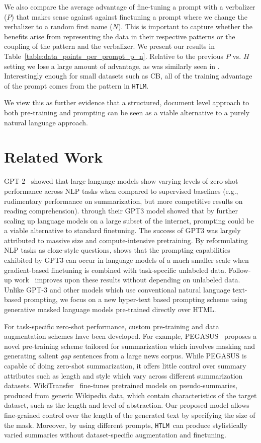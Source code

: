 \documentclass[11pt,a4paper]{article}
\newcommand{\HTLM}{\texttt{HTLM}}
\begin{document}
We also compare the average advantage of fine-tuning a prompt with a verbalizer ($P$) that makes sense against against finetuning a prompt where we change the verbalizer to a random first name ($N$). This is important to capture whether the benefits arise from representing the data in their respective patterns or the coupling of the pattern and the verbalizer. We present our results in Table~\ref{table:data_points_per_prompt_p_n}. Relative to the previous $P$ vs. $H$ setting we lose a large amount of advantage, as was similarly seen in \citep{how_many_datapoints}. Interestingly enough for small datasets such as CB, all of the training advantage of the prompt comes from the pattern in \HTLM{}.

We view this as further evidence that a structured, document level approach to both pre-training and prompting can be seen as a viable alternative to a purely natural language approach.

\section{Related Work}
GPT-2~\cite{GPT2} showed that large language models show varying levels of zero-shot performance across NLP tasks when compared to supervised baselines (e.g., rudimentary performance on summarization, but more competitive results on reading comprehension). 
\citet{gpt3} through their GPT3 model showed that by further scaling up language models on a large subset of the internet, prompting could be a viable alternative to standard finetuning. The success of GPT3 was largely attributed to massive size and compute-intensive pretraining. By reformulating NLP tasks as cloze-style questions, \citet{itsnotjustsize}  shows that the prompting capabilities exhibited by GPT3 can occur in language models of a much smaller scale when gradient-based finetuning is combined with task-specific unlabeled data. Follow-up work~\cite{adapet} improves upon these results without depending on unlabeled data. Unlike GPT-3 and other models which use conventional natural language text-based prompting, we focus on a new hyper-text based prompting scheme using generative masked language models pre-trained directly over HTML. 

For task-specific zero-shot performance, custom pre-training and data augmentation schemes have been developed. For example, PEGASUS~\citep{pegasus} proposes a novel pre-training scheme tailored for summarization which involves masking and generating salient \emph{gap} sentences from a large news corpus. While PEGASUS is capable of doing zero-shot summarization, it offers little control over summary attributes such as length and style which vary across different summarization datasets. 
WikiTransfer~\cite{Fabbri2021ImprovingZA}  fine-tunes pretrained models on pseudo-summaries, produced from generic Wikipedia data, which contain characteristics of the target dataset, such as the length and level of abstraction.
Our proposed model allows fine-grained control over the length of the generated text by specifying the size of the mask. Moreover, by using different prompts, \HTLM~can produce stylistically varied summaries without dataset-specific augmentation and finetuning. 
\end{document}
